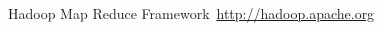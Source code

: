 \cleardoublepage
{}
{}
\begin{thebibliography}{99}

Hadoop Map Reduce Framework\ \url{http://hadoop.apache.org}

\end{thebibliography}
